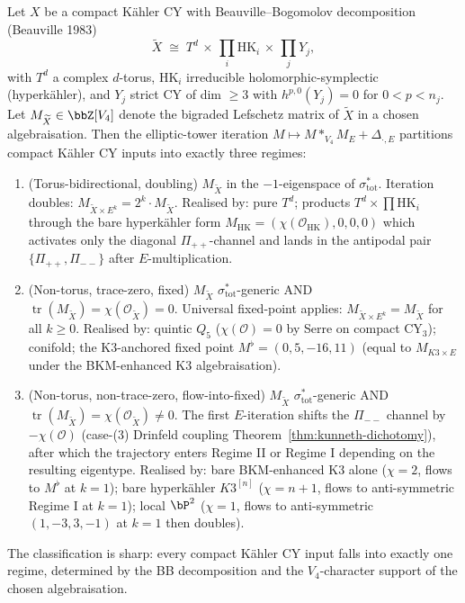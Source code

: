 \begin{corollary}
\label{cor:beauville-bogomolov-universal-extension}
Let $X$ be a compact K\"ahler CY with Beauville--Bogomolov decomposition
\textup{(}Beauville 1983\textup{)}
\[
 \widetilde X \;\cong\; T^d \,\times\, \prod_i \mathrm{HK}_i
 \,\times\, \prod_j Y_j,
\]
with $T^d$ a complex $d$-torus, $\mathrm{HK}_i$ irreducible
holomorphic-symplectic \textup{(}hyperk\"ahler\textup{)}, and $Y_j$ strict
CY of dim $\geq 3$ with $h^{p, 0}(Y_j) = 0$ for $0 < p < n_j$. Let
$M_{\widetilde X} \in \bbZ[V_4]$ denote the bigraded Lefschetz matrix of
$\widetilde X$ in a chosen algebraisation. Then the elliptic-tower
iteration $M \mapsto M *_{V_4} M_E + \Delta_{\cdot, E}$ partitions
compact K\"ahler CY inputs into exactly three regimes:
\begin{enumerate}[label=\textup{(\Roman*)}]
 \item \textup{(Torus-bidirectional, doubling)}
 $M_{\widetilde X}$ in the $-1$-eigenspace of
 $\sigma_{\mathrm{tot}}^*$. Iteration doubles:
 $M_{\widetilde X \times E^k} = 2^k \cdot M_{\widetilde X}$.
 Realised by: pure $T^d$; products $T^d \times \prod \mathrm{HK}_i$
 through the bare hyperk\"ahler form
 $M_{\mathrm{HK}} = (\chi(\mathcal{O}_{\mathrm{HK}}), 0, 0, 0)$ which
 activates only the diagonal $\Pi_{++}$-channel and lands in the
 antipodal pair $\{\Pi_{++}, \Pi_{--}\}$ after $E$-multiplication.
 \item \textup{(Non-torus, trace-zero, fixed)}
 $M_{\widetilde X}$ $\sigma_{\mathrm{tot}}^*$-generic AND
 $\operatorname{tr}(M_{\widetilde X}) = \chi(\mathcal{O}_{\widetilde X}) = 0$.
 Universal fixed-point applies:
 $M_{\widetilde X \times E^k} = M_{\widetilde X}$ for all $k \geq 0$.
 Realised by: quintic $Q_5$ \textup{(}$\chi(\mathcal{O}) = 0$ by Serre on
 compact CY$_3$\textup{);} conifold; the K$3$-anchored fixed point
 $M^\flat = (0, 5, -16, 11)$ \textup{(}equal to $M_{K3 \times E}$
 under the BKM-enhanced K$3$ algebraisation\textup{).}
 \item \textup{(Non-torus, non-trace-zero, flow-into-fixed)}
 $M_{\widetilde X}$ $\sigma_{\mathrm{tot}}^*$-generic AND
 $\operatorname{tr}(M_{\widetilde X}) = \chi(\mathcal{O}_{\widetilde X})
 \neq 0$. The first $E$-iteration shifts the $\Pi_{--}$ channel by
 $-\chi(\mathcal{O})$ \textup{(}case-(3) Drinfeld coupling
 Theorem~\ref{thm:kunneth-dichotomy}\textup{),} after which the
 trajectory enters Regime II or Regime I depending on the resulting
 eigentype. Realised by: bare BKM-enhanced K$3$ alone
 \textup{(}$\chi = 2$, flows to $M^\flat$ at $k = 1$\textup{);} bare
 hyperk\"ahler $K3^{[n]}$ \textup{(}$\chi = n + 1$, flows to
 anti-symmetric Regime I at $k = 1$\textup{);} local $\bP^2$
 \textup{(}$\chi = 1$, flows to anti-symmetric $(1, -3, 3, -1)$ at
 $k = 1$ then doubles\textup{).}
\end{enumerate}
The classification is sharp: every compact K\"ahler CY input falls into
exactly one regime, determined by the BB decomposition and the
$V_4$-character support of the chosen algebraisation.
\end{corollary}


